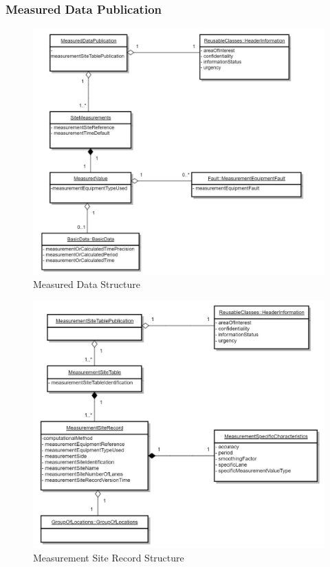 \subsubsection{Measured Data Publication}
\begin{figure}
	\begin{center}
		\includegraphics[width=0.8\columnwidth]{images/uml_3_8}
	\end{center}
	\caption{Measured Data Structure}
	\label{fig:app_uml_3_8}
\end{figure}
\begin{figure}
	\begin{center}
		\includegraphics[width=0.75\columnwidth]{images/uml_3_9}
	\end{center}
	\caption{Measurement Site Record Structure}
	\label{fig:app_uml_3_9}
\end{figure}
